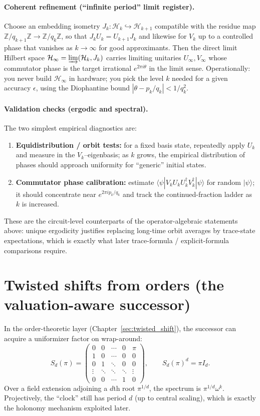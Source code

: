 \documentclass[11pt,oneside]{amsbook}
\numberwithin{equation}{section}
\theoremstyle{plain}
\theoremstyle{definition}
\theoremstyle{remark}
\newcommand{\Z}{\mathbb{Z}}
\newcommand{\cH}{\mathcal{H}}
\newcommand{\ket}[1]{\lvert #1 \rangle}
\begin{document}
\paragraph{Coherent refinement (``infinite period'' limit register).}
Choose an embedding isometry $J_k:\cH_k\hookrightarrow \cH_{k+1}$ compatible with the residue map $\Z/q_{k+1}\Z\to\Z/q_k\Z$,
so that $J_k U_k = U_{k+1} J_k$ and likewise for $V_k$ up to a controlled phase that vanishes as $k\to\infty$ for good approximants.
Then the direct limit Hilbert space $\cH_\infty=\varinjlim (\cH_k,J_k)$ carries limiting unitaries $U_\infty,V_\infty$
whose commutator phase is the target irrational $e^{2\pi i\theta}$ in the limit sense.
Operationally: you never build $\cH_\infty$ in hardware; you pick the level $k$ needed for a given accuracy $\epsilon$,
using the Diophantine bound $|\theta-p_k/q_k|<1/q_k^2$.

\paragraph{Validation checks (ergodic and spectral).}
The two simplest empirical diagnostics are:
\begin{enumerate}
\item \textbf{Equidistribution / orbit tests:} for a fixed basis state, repeatedly apply $U_k$ and measure in the $V_k$--eigenbasis;
as $k$ grows, the empirical distribution of phases should approach uniformity for ``generic'' initial states.
\item \textbf{Commutator phase calibration:} estimate $\langle\psi|V_kU_kU_k^\dagger V_k^\dagger|\psi\rangle$ for random $\ket{\psi}$;
it should concentrate near $e^{2\pi i p_k/q_k}$ and track the continued-fraction ladder as $k$ is increased.
\end{enumerate}

These are the circuit-level counterparts of the operator-algebraic statements above:
unique ergodicity justifies replacing long-time orbit averages by trace-state expectations,
which is exactly what later trace-formula / explicit-formula comparisons require.


\section{Twisted shifts from orders (the valuation-aware successor)}
In the order-theoretic layer (Chapter~\ref{sec:twisted_shift}), the successor can acquire a uniformizer factor on wrap-around:
\[
S_d(\pi)=
\begin{pmatrix}
0&0&\cdots&0&\pi\\
1&0&\cdots&0&0\\
0&1&\ddots&0&0\\
\vdots&\ddots&\ddots&\ddots&\vdots\\
0&0&\cdots&1&0
\end{pmatrix},
\qquad S_d(\pi)^d=\pi I_d.
\]
Over a field extension adjoining a $d$th root $\pi^{1/d}$, the spectrum is $\pi^{1/d}\omega^k$.
Projectively, the ``clock'' still has period $d$ (up to central scaling), which is exactly the holonomy mechanism exploited later.
\end{document}
